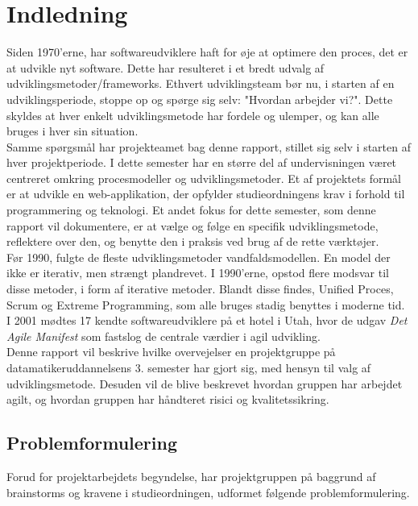 \chapter{Indledning}\label{ch:indledning}
Siden 1970'erne, har softwareudviklere haft for øje at optimere den proces, det er at udvikle nyt software.
Dette har resulteret i et bredt udvalg af udviklingsmetoder/frameworks. Ethvert udviklingsteam bør nu, 
i starten af en udviklingsperiode, stoppe op og spørge sig selv: "Hvordan arbejder vi?". 
Dette skyldes at hver enkelt udviklingsmetode har fordele og ulemper, og kan alle bruges i hver sin situation. \\

Samme spørgsmål har projekteamet bag denne rapport, stillet sig selv i starten af hver projektperiode. 
I dette semester har en større del af undervisningen
været centreret omkring procesmodeller og udviklingsmetoder. 
Et af projektets formål er at udvikle en web-applikation, der opfylder studieordningens krav
i forhold til programmering og teknologi. Et andet fokus for dette semester, 
som denne rapport vil dokumentere, er at vælge og følge en specifik udviklingsmetode, 
reflektere over den, og benytte den i praksis ved brug af de rette værktøjer. \\

Før 1990, fulgte de fleste udviklingsmetoder vandfaldsmodellen. En model der ikke er iterativ, 
men strængt plandrevet. I 1990'erne, opstod flere modsvar til
disse metoder, i form af iterative metoder. Blandt disse findes, Unified Proces, Scrum og Extreme Programming, 
som alle bruges stadig benyttes i moderne tid.
I 2001 mødtes 17 kendte softwareudviklere på et hotel i Utah, 
hvor de udgav \textit{Det Agile Manifest} som fastslog de centrale værdier i agil udvikling. \\

Denne rapport vil beskrive hvilke overvejelser en projektgruppe på 
datamatikeruddannelsens 3. semester har gjort sig, med hensyn til valg af udviklingsmetode.
Desuden vil de blive beskrevet hvordan gruppen har arbejdet agilt, 
og hvordan gruppen har håndteret risici og kvalitetssikring.

\newpage
\section{Problemformulering}
Forud for projektarbejdets begyndelse, har projektgruppen på baggrund af brainstorms og kravene i
studieordningen, udformet følgende problemformulering. \\

